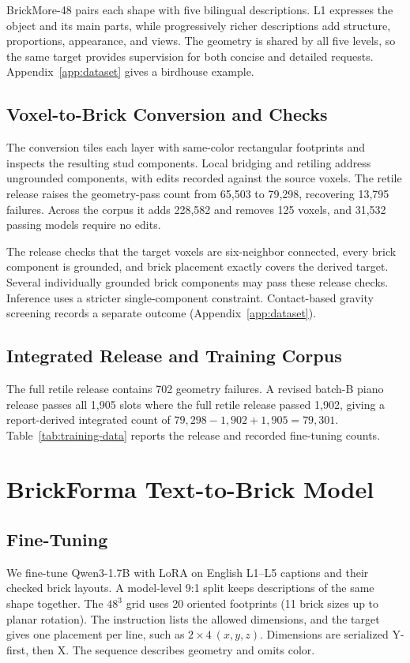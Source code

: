 BrickMore-48 pairs each shape with five bilingual descriptions. L1 expresses the object and its main parts, while progressively richer descriptions add structure, proportions, appearance, and views. The geometry is shared by all five levels, so the same target provides supervision for both concise and detailed requests. Appendix~\ref{app:dataset} gives a birdhouse example.

\subsection{Voxel-to-Brick Conversion and Checks}
The conversion tiles each layer with same-color rectangular footprints and inspects the resulting stud components. Local bridging and retiling address ungrounded components, with edits recorded against the source voxels. The retile release raises the geometry-pass count from 65,503 to 79,298, recovering 13,795 failures. Across the corpus it adds 228,582 and removes 125 voxels, and 31,532 passing models require no edits.

The release checks that the target voxels are six-neighbor connected, every brick component is grounded, and brick placement exactly covers the derived target. Several individually grounded brick components may pass these release checks. Inference uses a stricter single-component constraint. Contact-based gravity screening records a separate outcome (Appendix~\ref{app:dataset}).

\subsection{Integrated Release and Training Corpus}
The full retile release contains 702 geometry failures. A revised batch-B piano release passes all 1,905 slots where the full retile release passed 1,902, giving a report-derived integrated count of $79{,}298-1{,}902+1{,}905=79{,}301$. Table~\ref{tab:training-data} reports the release and recorded fine-tuning counts.


\section{BrickForma Text-to-Brick Model}
\label{sec:model}
\subsection{Fine-Tuning}
\label{sec:training}
We fine-tune Qwen3-1.7B with LoRA on English L1--L5 captions and their checked brick layouts. A model-level 9:1 split keeps descriptions of the same shape together. The $48^3$ grid uses 20 oriented footprints (11 brick sizes up to planar rotation). The instruction lists the allowed dimensions, and the target gives one placement per line, such as $2{\times}4\ (x,y,z)$. Dimensions are serialized Y-first, then X. The sequence describes geometry and omits color.

